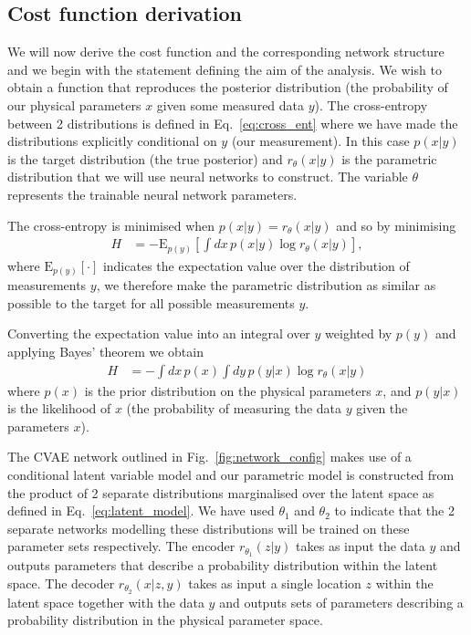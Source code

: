 \documentclass[%
showpacs,
nofootinbib,
 amsmath,amssymb,
 aps,
 twocolumn,
 prl,
 reprint,
floatfix,
]{revtex4-1}
\begin{document}
\subsection{Cost function derivation}
%
%
We will now derive the cost function and the corresponding network structure
and we begin with the statement defining the aim of the analysis. We wish to
obtain a function that reproduces the posterior distribution (the probability
of our physical parameters $x$ given some measured data $y$). The cross-entropy
between 2 distributions is defined in Eq.~\ref{eq:cross_ent} where we have made
the distributions explicitly conditional on $y$ (our measurement). In this case
$p(x|y)$ is the target distribution (the true posterior) and $r_{\theta}(x|y)$
is the parametric distribution that we will use neural networks to construct.
The variable $\theta$ represents the trainable neural network parameters. 

%
%
The cross-entropy is minimised when $p(x|y)=r_{\theta}(x|y)$ and so by
minimising
%
\begin{align}\label{eq:cost1}
H &= -\text{E}_{p(y)}\left[\int dx\,p(x|y) \log r_{\theta}(x|y)\right],
\end{align}
% 
where $\text{E}_{p(y)}[\cdot]$ indicates the expectation value over the
distribution of measurements $y$, we therefore make the parametric distribution
as similar as possible to the target for all possible measurements $y$.

%
%
Converting the expectation value into an integral over $y$ weighted by $p(y)$
and applying Bayes' theorem we obtain
%
\begin{align}\label{eq:cost1}
H &= -\int dx\,p(x)\int dy\,p(y|x)\log r_{\theta}(x|y)
\end{align}
%
where $p(x)$ is the prior distribution on the physical parameters $x$, and
$p(y|x)$ is the likelihood of $x$ (the probability of measuring the data $y$
given the parameters $x$). 

%
%
The \ac{CVAE} network outlined in Fig.~\ref{fig:network_config} makes use of a
conditional latent variable model and our parametric model is constructed from
the product of 2 separate distributions marginalised over the latent space as
defined in Eq.~\ref{eq:latent_model}. We have used $\theta_{1}$ and
$\theta_{2}$ to indicate that the 2 separate networks modelling these
distributions will be trained on these parameter sets respectively. The
encoder $r_{\theta_1}(z|y)$ takes as input the data $y$ and outputs parameters
that describe a probability distribution within the latent space. The decoder
$r_{\theta_2}(x|z,y)$ takes as input a single location $z$ within the latent
space together with the data $y$ and outputs sets of parameters describing a
probability distribution in the physical parameter space. 
\end{document}
